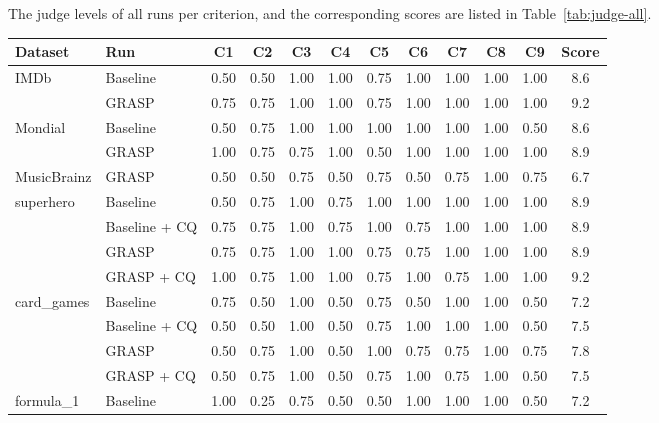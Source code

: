 The judge levels of all runs per criterion, and the corresponding scores are listed in Table~\ref{tab:judge-all}.
\begin{table}[!htbp]
  \centering
  \small
  \renewcommand{\arraystretch}{1.2}
  \setlength{\tabcolsep}{4pt}
  \begin{tabular}{l l c c c c c c c c c c}
    \hline
    \textbf{Dataset} & \textbf{Run} & \textbf{C1} & \textbf{C2} & \textbf{C3} & \textbf{C4} & \textbf{C5} & \textbf{C6} & \textbf{C7} & \textbf{C8} & \textbf{C9} & \textbf{Score} \\
    \hline
    IMDb       & Baseline      & 0.50 & 0.50 & 1.00 & 1.00 & 0.75 & 1.00 & 1.00 & 1.00 & 1.00 & 8.6 \\
               & GRASP         & 0.75 & 0.75 & 1.00 & 1.00 & 0.75 & 1.00 & 1.00 & 1.00 & 1.00 & 9.2 \\
    \hline
    Mondial    & Baseline      & 0.50 & 0.75 & 1.00 & 1.00 & 1.00 & 1.00 & 1.00 & 1.00 & 0.50 & 8.6 \\
               & GRASP         & 1.00 & 0.75 & 0.75 & 1.00 & 0.50 & 1.00 & 1.00 & 1.00 & 1.00 & 8.9 \\
    \hline
    MusicBrainz & GRASP         & 0.50 & 0.50 & 0.75 & 0.50 & 0.75 & 0.50 & 0.75 & 1.00 & 0.75 & 6.7 \\
    \hline
    superhero  & Baseline      & 0.50 & 0.75 & 1.00 & 0.75 & 1.00 & 1.00 & 1.00 & 1.00 & 1.00 & 8.9 \\
               & Baseline + CQ & 0.75 & 0.75 & 1.00 & 0.75 & 1.00 & 0.75 & 1.00 & 1.00 & 1.00 & 8.9 \\
               & GRASP         & 0.75 & 0.75 & 1.00 & 1.00 & 0.75 & 0.75 & 1.00 & 1.00 & 1.00 & 8.9 \\
               & GRASP + CQ    & 1.00 & 0.75 & 1.00 & 1.00 & 0.75 & 1.00 & 0.75 & 1.00 & 1.00 & 9.2 \\
    \hline
    card\_games & Baseline      & 0.75 & 0.50 & 1.00 & 0.50 & 0.75 & 0.50 & 1.00 & 1.00 & 0.50 & 7.2 \\
               & Baseline + CQ & 0.50 & 0.50 & 1.00 & 0.50 & 0.75 & 1.00 & 1.00 & 1.00 & 0.50 & 7.5 \\
               & GRASP         & 0.50 & 0.75 & 1.00 & 0.50 & 1.00 & 0.75 & 0.75 & 1.00 & 0.75 & 7.8 \\
               & GRASP + CQ    & 0.50 & 0.75 & 1.00 & 0.50 & 0.75 & 1.00 & 0.75 & 1.00 & 0.50 & 7.5 \\
    \hline
    formula\_1 & Baseline      & 1.00 & 0.25 & 0.75 & 0.50 & 0.50 & 1.00 & 1.00 & 1.00 & 0.50 & 7.2 \\

\end{tabular}
\end{table}
